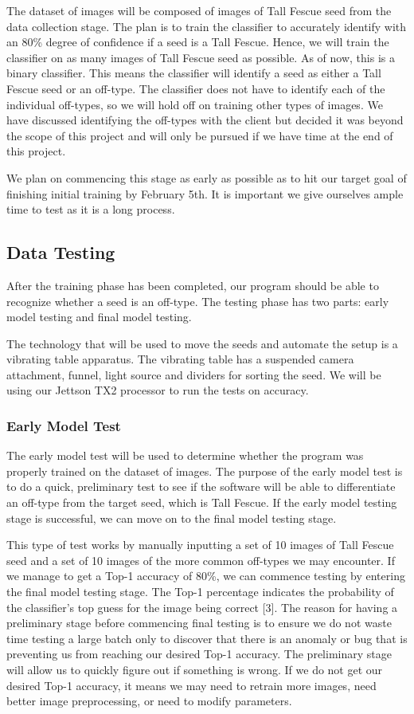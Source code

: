 \documentclass[onecolumn, draftclsnofoot,10pt, compsoc]{IEEEtran}
\begin{document}
The dataset of images will be composed of images of Tall Fescue seed from the data collection stage. The plan is to train the classifier to accurately identify with an 80\% degree of confidence if a seed is a Tall Fescue. Hence, we will train the classifier on as many images of Tall Fescue seed as possible. As of now, this is a binary classifier. This means the classifier will identify a seed as either a Tall Fescue seed or an off-type. The classifier does not have to identify each of the individual off-types, so we will hold off on training other types of images. We have discussed identifying the off-types with the client but decided it was beyond the scope of this project and will only be pursued if we have time at the end of this project.

We plan on commencing this stage as early as possible as to hit our target goal of finishing initial training by February 5th. It is important we give ourselves ample time to test as it is a long process. 

\subsection{Data Testing}
After the training phase has been completed, our program should be able to recognize whether a seed is an off-type. The testing phase has two parts: early model testing and final model testing. 


The technology that will be used to move the seeds and automate the setup is a vibrating table apparatus. The vibrating table has a suspended camera attachment, funnel, light source and dividers for sorting the seed. We will be using our Jettson TX2 processor to run the tests on accuracy. 

\subsubsection{Early Model Test}
The early model test will be used to determine whether the program was properly trained on the dataset of images. The purpose of the early model test is to do a quick, preliminary test to see if the software will be able to differentiate an off-type from the target seed, which is Tall Fescue. If the early model testing stage is successful, we can move on to the final model testing stage. 

This type of test works by manually inputting a set of 10 images of Tall Fescue seed and a set of 10 images of the more common off-types we may encounter. If we manage to get a Top-1 accuracy of 80\%, we can commence testing by entering the final model testing stage. The Top-1 percentage indicates the probability of the classifier’s top guess for the image being correct [3]. The reason for having a preliminary stage before commencing final testing is to ensure we do not waste time testing a large batch only to discover that there is an anomaly or bug that is preventing us from reaching our desired Top-1 accuracy. The preliminary stage will allow us to quickly figure out if something is wrong. If we do not get our desired Top-1 accuracy, it means we may need to retrain more images, need better image preprocessing, or need to modify parameters.  
\end{document}
